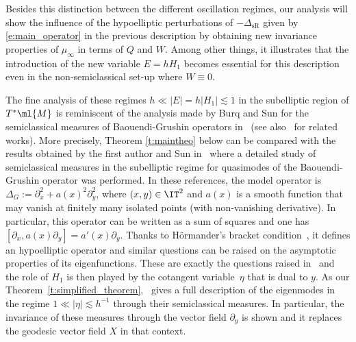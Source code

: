 \documentclass[10pt]{amsart}
\theoremstyle{plain}
\theoremstyle{definition}
\theoremstyle{remark}
\begin{document}
Besides this distinction between the different oscillation regimes, our analysis will show the influence of the hypoelliptic perturbations of $-\Delta_{\text{sR}}$ given by \eqref{e:main_operator} in the previous description by obtaining new invariance properties of $\mu_\infty$ in terms of $Q$ and $W$. Among other things, it illustrates that the introduction of the new variable $E=hH_1$ becomes essential for this description even in the non-semiclassical set-up where $W\equiv 0$.


The fine analysis of these regimes $h\ll |E|=h|H_1|\lesssim 1$ in the subelliptic region of $T^*\ml{M}$ is reminiscent of the analysis made by Burq and Sun for the semiclassical measures of Baouendi-Grushin operators in~\cite{BurqSun22} (see also~\cite{LetrouitSun20, ArnaizSun22} for related works). More precisely, Theorem \ref{t:maintheo} below can be compared with the results obtained by the first author and Sun in~\cite{ArnaizSun22} where a detailed study of semiclassical measures in the subelliptic regime for quasimodes of the Baouendi-Grushin operator was performed. In these references, the model operator is $\Delta_G:=\partial_x^2+ a(x)^2\partial_y^2$, where $(x,y)\in\IT^2$ and $a(x)$ is a smooth function that may vanish at finitely many isolated points (with non-vanishing derivative). In particular, this operator can be written as a sum of squares and one has $[\partial_x,a(x) \partial_y]= a'(x)\partial_y$. Thanks to Hörmander's bracket condition~\cite{Hormander67}, it defines an hypoelliptic operator and similar questions can be raised on the asymptotic properties of its eigenfunctions. These are exactly the questions raised in~\cite{BurqSun22} and the role of $H_1$ is then played by the cotangent variable~$\eta$ that is dual to $y$. As our Theorem~\ref{t:simplified_theorem},~\cite[\S3]{ArnaizSun22} gives a full description of the eigenmodes in the regime $1\ll |\eta|\lesssim h^{-1}$ through their semiclassical measures. In particular, the invariance of these measures through the vector field $\partial_y$ is shown and it replaces the geodesic vector field $X$ in that context.
\end{document}
